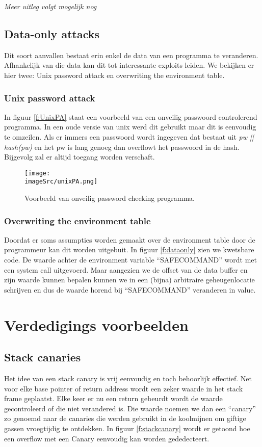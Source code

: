 \documentclass[../main.tex]{subfiles}
\begin{document}
\textit{Meer uitleg volgt mogelijk nog}



\subsection{Data-only attacks}
Dit soort aanvallen bestaat erin enkel de data van een programma te veranderen.
Afhankelijk van die data kan dit tot interessante exploits leiden.
We bekijken er hier twee: Unix password attack en overwriting the environment table.
\subsubsection{Unix password attack}
In figuur \ref{f:UnixPA} staat een voorbeeld van een onveilig passwoord controlerend programma.
In een oude versie van unix werd dit gebruikt maar dit is eenvoudig te omzeilen.
Als er immers een passwoord wordt ingegeven dat bestaat uit \emph{pw || hash(pw)} en het pw is lang genoeg dan overflowt het passwoord in de hash.
Bijgevolg zal er altijd toegang worden verschaft.

\begin{figure}
\centering
\texttt{[image: \\imageSrc/unixPA.png]}
\caption{Voorbeeld van onveilig password checking programma.}
\label{f:unixPA}
\end{figure}

\subsubsection{Overwriting the environment table}
Doordat er soms assumpties worden gemaakt over de environment table door de programmeur kan dit worden uitgebuit. 
In figuur \ref{f:dataonly} zien we kwetsbare code.
De waarde achter de environment variable ``SAFECOMMAND'' wordt met een system call uitgevoerd.
Maar aangezien we de offset van de data buffer en zijn waarde kunnen bepalen kunnen we in een (bijna) arbitraire geheugenlocatie schrijven en dus de waarde horend bij ``SAFECOMMAND'' veranderen in value.



\section{Verdedigings voorbeelden}
\subsection{Stack canaries}
Het idee van een stack canary is vrij eenvoudig en toch behoorlijk effectief.
Net voor elke base pointer of return address wordt een zeker waarde in het stack frame geplaatst.
Elke keer er nu een return gebeurdt wordt de waarde gecontroleerd of die niet verandered is.
Die waarde noemen we dan een ``canary'' zo genoemd naar de canaries die werden gebruikt in de koolmijnen om giftige gassen vroegtijdig te ontdekken.
In figuur \ref{f:stackcanary} wordt er getoond hoe een overflow met een Canary eenvoudig kan worden gededecteert.
\end{document}

